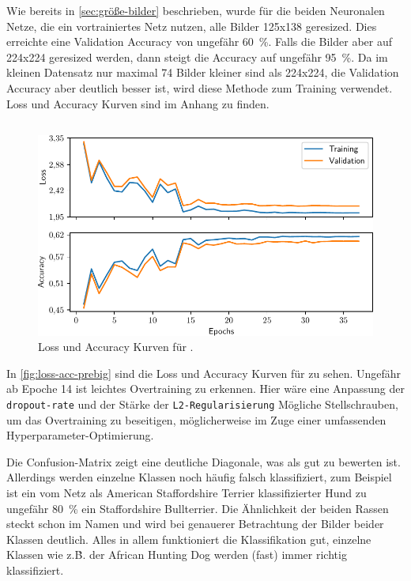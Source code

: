 Wie bereits in \autoref{sec:größe-bilder} beschrieben, wurde für die beiden
Neuronalen Netze, die ein vortrainiertes Netz nutzen, alle Bilder 125x138
geresized. Dies erreichte eine Validation Accuracy von ungefähr \SI{60}{\percent}.
Falls die Bilder aber auf 224x224 geresized werden, dann steigt die Accuracy
auf ungefähr \SI{95}{\percent}. Da im kleinen Datensatz nur maximal 74 Bilder
kleiner sind als 224x224, die Validation Accuracy aber deutlich besser ist, wird diese Methode zum Training verwendet.
Loss und Accuracy Kurven sind im Anhang zu finden.

\subsection{\PreBig}

\begin{figure}
  \centering
  \includegraphics[scale=0.8]{pics/ergebnisse/PreBigDogNN/history_epoch.pdf}
  \caption{Loss und Accuracy Kurven für \PreBig.}
  \label{fig:loss-acc-prebig}
\end{figure}

In \autoref{fig:loss-acc-prebig} sind die Loss und Accuracy Kurven für \PreBig
zu sehen. Ungefähr ab Epoche 14 ist leichtes Overtraining zu erkennen. Hier
wäre eine Anpassung der \texttt{dropout-rate} und der Stärke der \texttt{L2-Regularisierung}
Mögliche Stellschrauben, um das Overtraining zu beseitigen, möglicherweise im Zuge
einer umfassenden Hyperparameter-Optimierung.

Die Confusion-Matrix zeigt eine deutliche Diagonale, was als gut zu bewerten ist.
Allerdings werden einzelne Klassen noch häufig falsch klassifiziert, zum Beispiel
ist ein vom Netz als American Staffordshire Terrier klassifizierter Hund zu ungefähr
\SI{80}{\percent} ein Staffordshire Bullterrier. Die Ähnlichkeit der beiden Rassen
steckt schon im Namen und wird bei genauerer Betrachtung der Bilder beider Klassen
deutlich. Alles in allem funktioniert die Klassifikation gut, einzelne Klassen
wie z.\.B. der African Hunting Dog werden (fast) immer richtig klassifiziert.

